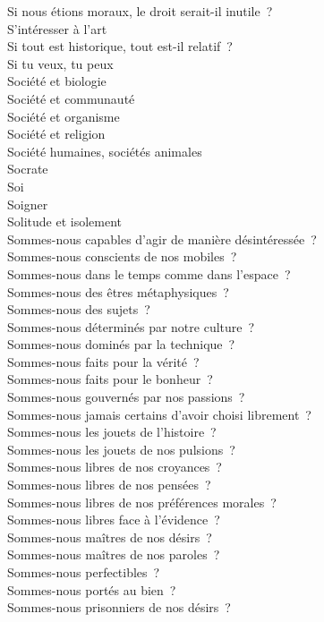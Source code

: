 \documentclass[a4paper,12pt]{article}
\begin{document}
Si nous étions moraux, le droit serait-il inutile ? \\
S'intéresser à l'art \\
Si tout est historique, tout est-il relatif ? \\
Si tu veux, tu peux \\
Société et biologie \\
Société et communauté \\
Société et organisme \\
Société et religion \\
Société humaines, sociétés animales \\
Socrate \\
Soi \\
Soigner \\
Solitude et isolement \\
Sommes-nous capables d'agir de manière désintéressée ? \\
Sommes-nous conscients de nos mobiles ? \\
Sommes-nous dans le temps comme dans l'espace ? \\
Sommes-nous des êtres métaphysiques ? \\
Sommes-nous des sujets ? \\
Sommes-nous déterminés par notre culture ? \\
Sommes-nous dominés par la technique ? \\
Sommes-nous faits pour la vérité ? \\
Sommes-nous faits pour le bonheur ? \\
Sommes-nous gouvernés par nos passions ? \\
Sommes-nous jamais certains d'avoir choisi librement ? \\
Sommes-nous les jouets de l'histoire ? \\
Sommes-nous les jouets de nos pulsions ? \\
Sommes-nous libres de nos croyances ? \\
Sommes-nous libres de nos pensées ? \\
Sommes-nous libres de nos préférences morales ? \\
Sommes-nous libres face à l'évidence ? \\
Sommes-nous maîtres de nos désirs ? \\
Sommes-nous maîtres de nos paroles ? \\
Sommes-nous perfectibles ? \\
Sommes-nous portés au bien ? \\
Sommes-nous prisonniers de nos désirs ? \\
\end{document}
